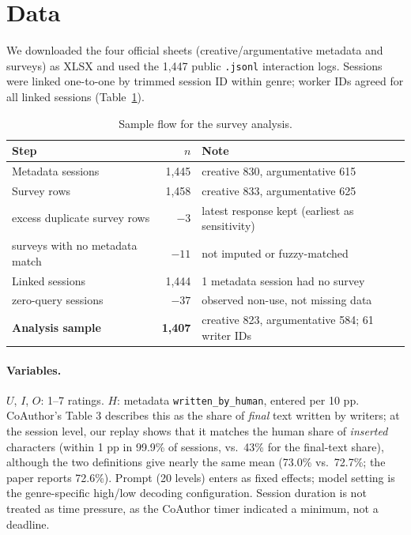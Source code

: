 \documentclass[10pt]{article}
\begin{document}
\section{Data}
We downloaded the four official sheets (creative/argumentative metadata and surveys) as XLSX and used the 1,447 public \texttt{.jsonl} interaction logs. Sessions were linked one-to-one by trimmed session ID within genre; worker IDs agreed for all linked sessions (Table~\ref{tab:flow}).

\begin{table}[h]
\centering\small
\caption{Sample flow for the survey analysis.}\label{tab:flow}
\begin{tabular}{lrl}
\toprule
Step & $n$ & Note \\
\midrule
Metadata sessions & 1,445 & creative 830, argumentative 615 \\
Survey rows & 1,458 & creative 833, argumentative 625 \\
\quad excess duplicate survey rows & $-3$ & latest response kept (earliest as sensitivity) \\
\quad surveys with no metadata match & $-11$ & not imputed or fuzzy-matched \\
Linked sessions & 1,444 & 1 metadata session had no survey \\
\quad zero-query sessions & $-37$ & observed non-use, not missing data \\
\textbf{Analysis sample} & \textbf{1,407} & creative 823, argumentative 584; 61 writer IDs \\
\bottomrule
\end{tabular}
\end{table}

\paragraph{Variables.} $U$, $I$, $O$: 1--7 ratings. $H$: metadata \texttt{written\_by\_human}, entered per 10 pp. CoAuthor's Table 3 describes this as the share of \emph{final} text written by writers; at the session level, our replay shows that it matches the human share of \emph{inserted} characters (within 1 pp in 99.9\% of sessions, vs.\ 43\% for the final-text share), although the two definitions give nearly the same mean (73.0\% vs.\ 72.7\%; the paper reports 72.6\%). Prompt (20 levels) enters as fixed effects; model setting is the genre-specific high/low decoding configuration. Session duration is not treated as time pressure, as the CoAuthor timer indicated a minimum, not a deadline.
\end{document}
